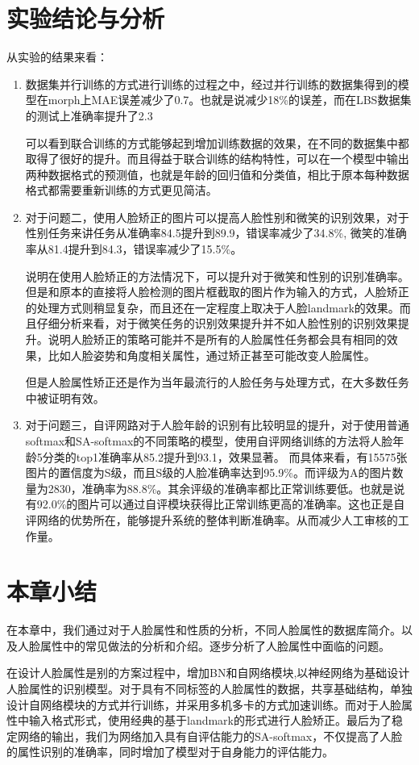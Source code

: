 \section{实验结论与分析}
从实验的结果来看：
\begin{enumerate}
\item 数据集并行训练的方式进行训练的过程之中，经过并行训练的数据集得到的模型在morph上MAE误差减少了0.7。也就是说减少18\%的误差，而在LBS数据集的测试上准确率提升了2.3%

可以看到联合训练的方式能够起到增加训练数据的效果，在不同的数据集中都取得了很好的提升。而且得益于联合训练的结构特性，可以在一个模型中输出两种数据格式的预测值，也就是年龄的回归值和分类值，相比于原本每种数据格式都需要重新训练的方式更见简洁。


\item 对于问题二，使用人脸矫正的图片可以提高人脸性别和微笑的识别效果，对于性别任务来讲任务从准确率84.5提升到89.9，错误率减少了34.8\%,
微笑的准确率从81.4提升到84.3，错误率减少了15.5\%。

说明在使用人脸矫正的方法情况下，可以提升对于微笑和性别的识别准确率。但是和原本的直接将人脸检测的图片框截取的图片作为输入的方式，人脸矫正的处理方式则稍显复杂，而且还在一定程度上取决于人脸landmark的效果。而且仔细分析来看，对于微笑任务的识别效果提升并不如人脸性别的识别效果提升。说明人脸矫正的策略可能并不是所有的人脸属性任务都会具有相同的效果，比如人脸姿势和角度相关属性，通过矫正甚至可能改变人脸属性。

但是人脸属性矫正还是作为当年最流行的人脸任务与处理方式，在大多数任务中被证明有效。
\item 
对于问题三，自评网路对于人脸年龄的识别有比较明显的提升，对于使用普通softmax和SA-softmax的不同策略的模型，使用自评网络训练的方法将人脸年龄5分类的top1准确率从85.2提升到93.1，效果显著。
而具体来看，有15575张图片的置信度为S级，而且S级的人脸准确率达到95.9\%。而评级为A的图片数量为2830，准确率为88.8\%。其余评级的准确率都比正常训练要低。也就是说有92.0\%的图片可以通过自评模块获得比正常训练更高的准确率。这也正是自评网络的优势所在，能够提升系统的整体判断准确率。从而减少人工审核的工作量。
\end{enumerate}

\section{本章小结}
在本章中，我们通过对于人脸属性和性质的分析，不同人脸属性的数据库简介。以及人脸属性中的常见做法的分析和介绍。逐步分析了人脸属性中面临的问题。

在设计人脸属性是别的方案过程中，增加BN和自网络模块,以神经网络为基础设计人脸属性的识别模型。对于具有不同标签的人脸属性的数据，共享基础结构，单独设计自网络模块的方式并行训练，并采用多机多卡的方式加速训练。而对于人脸属性中输入格式形式，使用经典的基于landmark的形式进行人脸矫正。最后为了稳定网络的输出，我们为网络加入具有自评估能力的SA-softmax，不仅提高了人脸的属性识别的准确率，同时增加了模型对于自身能力的评估能力。









 
 
 